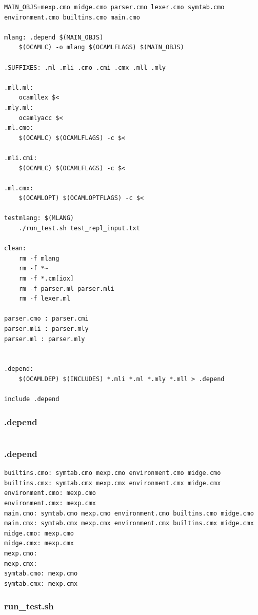 \documentclass[letterpaper,11pt]{article}
\begin{document}
{\begin{lstlisting}
MAIN_OBJS=mexp.cmo midge.cmo parser.cmo lexer.cmo symtab.cmo environment.cmo builtins.cmo main.cmo

mlang: .depend $(MAIN_OBJS)
	$(OCAMLC) -o mlang $(OCAMLFLAGS) $(MAIN_OBJS)

.SUFFIXES: .ml .mli .cmo .cmi .cmx .mll .mly

.mll.ml:
	ocamllex $<
.mly.ml:
	ocamlyacc $<
.ml.cmo:
	$(OCAMLC) $(OCAMLFLAGS) -c $<

.mli.cmi:
	$(OCAMLC) $(OCAMLFLAGS) -c $<

.ml.cmx:
	$(OCAMLOPT) $(OCAMLOPTFLAGS) -c $<

testmlang: $(MLANG)
	./run_test.sh test_repl_input.txt

clean:
	rm -f mlang
	rm -f *~
	rm -f *.cm[iox]
	rm -f parser.ml parser.mli
	rm -f lexer.ml

parser.cmo : parser.cmi
parser.mli : parser.mly
parser.ml : parser.mly


.depend:
	$(OCAMLDEP) $(INCLUDES) *.mli *.ml *.mly *.mll > .depend

include .depend
\end{lstlisting}

\subsubsection{.depend}
\begin{lstlisting}
\end{lstlisting}

\subsubsection{.depend}
\lstset{language=bash}
\begin{lstlisting}
builtins.cmo: symtab.cmo mexp.cmo environment.cmo midge.cmo
builtins.cmx: symtab.cmx mexp.cmx environment.cmx midge.cmx
environment.cmo: mexp.cmo
environment.cmx: mexp.cmx
main.cmo: symtab.cmo mexp.cmo environment.cmo builtins.cmo midge.cmo
main.cmx: symtab.cmx mexp.cmx environment.cmx builtins.cmx midge.cmx
midge.cmo: mexp.cmo
midge.cmx: mexp.cmx
mexp.cmo:
mexp.cmx:
symtab.cmo: mexp.cmo
symtab.cmx: mexp.cmx
\end{lstlisting}

\subsubsection{run\_test.sh}
\lstset{language=bash}
\begin{lstlisting}


\end{lstlisting}}
\end{document}
